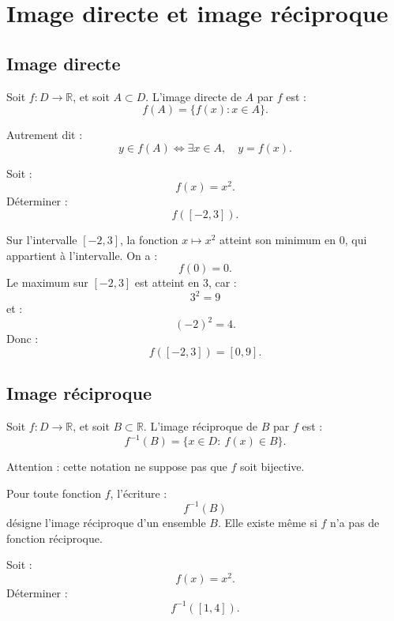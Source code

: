 \documentclass[11pt,a4paper]{article}
\newcommand{\R}{\mathbb R}
\newcommand{\ssi}{\Longleftrightarrow}
\begin{document}
\section{Image directe et image réciproque}

\subsection{Image directe}

\begin{definitionbox}
Soit \(f:D\to\R\), et soit \(A\subset D\).  
L'image directe de \(A\) par \(f\) est :
\[
f(A)=\{f(x):x\in A\}.
\]
\end{definitionbox}

Autrement dit :
\[
y\in f(A)
\ssi
\exists x\in A,\quad y=f(x).
\]

\begin{exercicebox}
Soit :
\[
f(x)=x^2.
\]
Déterminer :
\[
f([-2,3]).
\]
\end{exercicebox}

\begin{correctionbox}
Sur l'intervalle \([-2,3]\), la fonction \(x\mapsto x^2\) atteint son minimum en \(0\), qui appartient à l'intervalle.  
On a :
\[
f(0)=0.
\]
Le maximum sur \([-2,3]\) est atteint en \(3\), car :
\[
3^2=9
\]
et :
\[
(-2)^2=4.
\]
Donc :
\[
f([-2,3])=[0,9].
\]
\end{correctionbox}

\subsection{Image réciproque}

\begin{definitionbox}
Soit \(f:D\to\R\), et soit \(B\subset\R\).  
L'image réciproque de \(B\) par \(f\) est :
\[
f^{-1}(B)=\{x\in D:\ f(x)\in B\}.
\]
\end{definitionbox}

Attention : cette notation ne suppose pas que \(f\) soit bijective.

\begin{retenirbox}
Pour toute fonction \(f\), l'écriture :
\[
f^{-1}(B)
\]
désigne l'image réciproque d'un ensemble \(B\).  
Elle existe même si \(f\) n'a pas de fonction réciproque.
\end{retenirbox}

\begin{exercicebox}
Soit :
\[
f(x)=x^2.
\]
Déterminer :
\[
f^{-1}([1,4]).
\]
\end{exercicebox}
\end{document}
